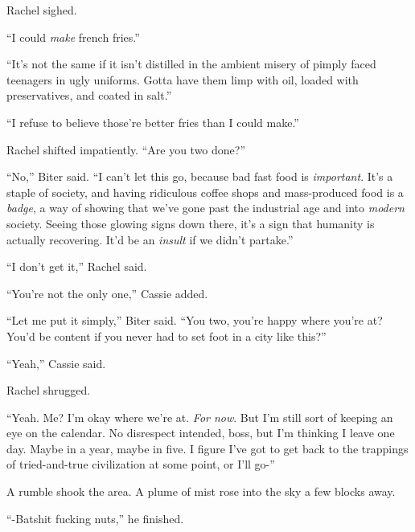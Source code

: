 Rachel sighed.



``I could \emph{make} french fries.''



``It's not the same if it isn't distilled in the ambient misery of pimply faced teenagers in ugly uniforms.  Gotta have them limp with oil, loaded with preservatives, and coated in salt.''



``I refuse to believe those're better fries than I could make.''



Rachel shifted impatiently.  ``Are you two done?''



``No,'' Biter said.  ``I can't let this go, because bad fast food is \emph{important}.  It's a staple of society, and having ridiculous coffee shops and mass-produced food is a \emph{badge}, a way of showing that we've gone past the industrial age and into \emph{modern} society.  Seeing those glowing signs down there, it's a sign that humanity is actually recovering.  It'd be an \emph{insult }if we didn't partake.''



``I don't get it,'' Rachel said.



``You're not the only one,'' Cassie added.



``Let me put it simply,'' Biter said.  ``You two, you're happy where you're at?  You'd be content if you never had to set foot in a city like this?''



``Yeah,'' Cassie said.



Rachel shrugged.



``Yeah.  Me?  I'm okay where we're at.  \emph{For now}.  But I'm still sort of keeping an eye on the calendar.  No disrespect intended, boss, but I'm thinking I leave one day.  Maybe in a year, maybe in five.  I figure I've got to get back to the trappings of tried-and-true civilization at some point, or I'll go-''



A rumble shook the area.  A plume of mist rose into the sky a few blocks away.



``-Batshit fucking nuts,'' he finished.



